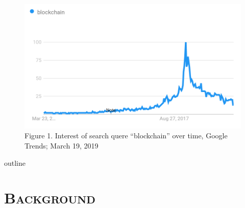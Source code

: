 \documentclass[xcolor=x11names,compress]{beamer}
\renewcommand{\(}{\begin{columns}}
\renewcommand{\)}{\end{columns}}
\newcommand{\<}[1]{\begin{column}{#1}}
\renewcommand{\>}{\end{column}}
\begin{document}
\begin{frame}
    \begin{figure}
        \includegraphics[scale=0.3]{./images/trends}
        \caption{\tiny  Figure 1. Interest of search quere ``blockchain'' over time, Google Trends; March 19, 2019}
    \end{figure}
\end{frame}

\begin{frame}{outline}
    \tableofcontents
\end{frame}

\section{\scshape Background}
\end{document}
